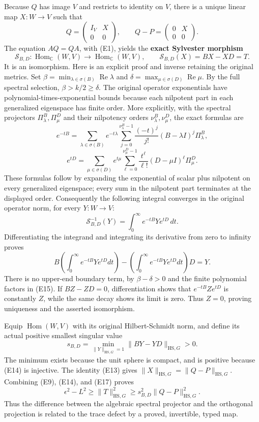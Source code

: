 Because \(Q\) has image \(V\) and restricts to identity on \(V\), there is a unique linear map \(X:W\to V\) such that
\[
Q=\begin{pmatrix}I_V&X\\0&0\end{pmatrix},\qquad
Q-P=\begin{pmatrix}0&X\\0&0\end{pmatrix}.
\tag{E13}
\]
The equation \(AQ=QA\), with (E1), yields the \textbf{exact Sylvester morphism}
\[
\mathscr S_{B,D}:\operatorname{Hom}_{\mathbb C}(W,V)
   \longrightarrow\operatorname{Hom}_{\mathbb C}(W,V),
\qquad \mathscr S_{B,D}(X)=BX-XD=T.
\tag{E14}
\]
It is an isomorphism. Here is an explicit proof and inverse retaining the original metrics. Set
\(\beta=\min_{\lambda\in\sigma(B)}\operatorname{Re}\lambda\) and
\(\delta=\max_{\mu\in\sigma(D)}\operatorname{Re}\mu\). By the full spectral selection, \(\beta>k/2\geq\delta\). The original operator exponentials have polynomial-times-exponential bounds because each nilpotent part in each generalized eigenspace has finite order. More explicitly, with the spectral projectors \(\Pi^B_\lambda,\Pi^D_\mu\) and their nilpotency orders \(\nu^B_\lambda,\nu^D_\mu\), the exact formulas are
\[
e^{-tB}=\sum_{\lambda\in\sigma(B)}e^{-t\lambda}
 \sum_{j=0}^{\nu^B_\lambda-1}\frac{(-t)^j}{j!}
 (B-\lambda I)^j\Pi^B_\lambda,
\]
\[
e^{tD}=\sum_{\mu\in\sigma(D)}e^{t\mu}
 \sum_{\ell=0}^{\nu^D_\mu-1}\frac{t^\ell}{\ell!}
 (D-\mu I)^\ell\Pi^D_\mu.
\tag{E15}
\]
These formulas follow by expanding the exponential of scalar plus nilpotent on every generalized eigenspace; every sum in the nilpotent part terminates at the displayed order. Consequently the following integral converges in the original operator norm, for every \(Y:W\to V\):
\[
\mathscr S_{B,D}^{-1}(Y)=\int_0^\infty e^{-tB}Y e^{tD}\,dt.
\tag{E16}
\]
Differentiating the integrand and integrating its derivative from zero to infinity proves
\[
B\left(\int_0^\infty e^{-tB}Y e^{tD}dt\right)
-\left(\int_0^\infty e^{-tB}Y e^{tD}dt\right)D=Y.
\]
There is no upper-end boundary term, by \(\beta-\delta>0\) and the finite polynomial factors in (E15). If \(BZ-ZD=0\), differentiation shows that \(e^{-tB}Ze^{tD}\) is constantly \(Z\), while the same decay shows its limit is zero. Thus \(Z=0\), proving uniqueness and the asserted isomorphism.

Equip \(\operatorname{Hom}(W,V)\) with its original Hilbert-Schmidt norm, and define its actual positive smallest singular value
\[
s_{B,D}=\min_{\|Y\|_{\mathrm{HS},G}=1}
\|BY-YD\|_{\mathrm{HS},G}>0.
\tag{E17}
\]
The minimum exists because the unit sphere is compact, and is positive because (E14) is injective. The identity (E13) gives \(\|X\|_{\mathrm{HS},G}=\|Q-P\|_{\mathrm{HS},G}\). Combining (E9), (E14), and (E17) proves
\[
\boxed{\quad
\epsilon^2-L^2\geq\|T\|_{\mathrm{HS},G}^2
\geq s_{B,D}^2\|Q-P\|_{\mathrm{HS},G}^2.
\quad}
\tag{E18}
\]
Thus the difference between the algebraic spectral projector and the orthogonal projection is related to the trace defect by a proved, invertible, typed map.

